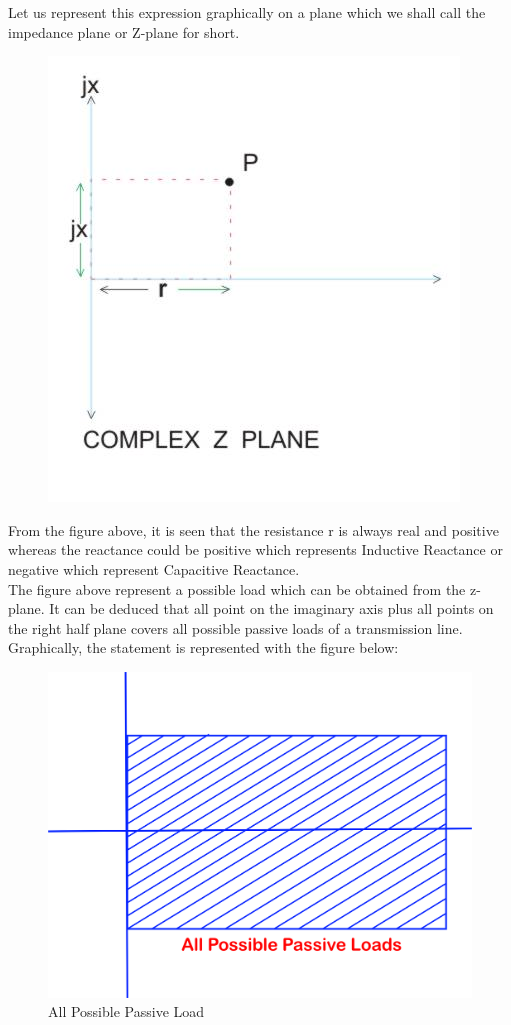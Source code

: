 Let us represent this expression graphically on a plane which we shall call the impedance plane or Z-plane for short.
\begin{figure}
\center\includegraphics[width=0.5\linewidth]{./graphics/TransLine2}
\label{fig:transline2}
\end{figure}

From the figure above, it is seen that the resistance r is always real and positive whereas the reactance could be positive which represents Inductive Reactance or negative which represent Capacitive Reactance.\\
The figure above represent a possible load which can be obtained from the z-plane.  It can be deduced that all point on the imaginary axis plus all points on the right half plane covers all possible passive loads of a transmission line.
Graphically, the statement is represented with the figure below:
\begin{figure}[h]
\centering
\includegraphics[width=0.6\linewidth]{./graphics/oigvbnkliu}
\caption{All Possible Passive Load}
\label{fig:oigvbnkliu}
\end{figure}

